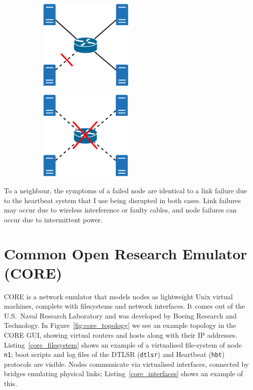 \documentclass[withindex,glossary,openany]{cam-thesis}
\begin{document}
\begin{figure}[H]
\centering
\begin{subfigure}{0.5\textwidth}
	\centering
	\includegraphics[width=0.5\textwidth]{link_failure}
	\label{fig:link_failure}
\end{subfigure}%
\begin{subfigure}{0.5\textwidth}
	\centering
	\includegraphics[width=0.5\textwidth]{node_failure}
	\label{fig:node_failure}
\end{subfigure}
\end{figure}

To a neighbour, the symptoms of a failed node are identical to a link failure due to the heartbeat system that I use being disrupted in both cases. Link failures may occur due to wireless interference or faulty cables, and node failures can occur due to intermittent power.

\section{Common Open Research Emulator (CORE)}
\label{sec:core}

CORE \cite{CORE} is a network emulator that models nodes as lightweight Unix virtual machines, complete with filesystems and network interfaces. It comes out of the U.S.\ Naval Research Laboratory and was developed by Boeing Research and Technology. In Figure~\ref{fig:core_topology} we see an example topology in the CORE GUI, showing virtual routers and hosts along with their IP addresses. Listing~\ref{core_filesystem} shows an example of a virtualised file-system of node \texttt{n1}; boot scripts and log files of the DTLSR (\texttt{dtlsr}) and Heartbeat (\texttt{hbt}) protocols are visible. Nodes communicate via virtualised interfaces, connected by bridges emulating physical links; Listing~\ref{core_interfaces} shows an example of this.
\end{document}
